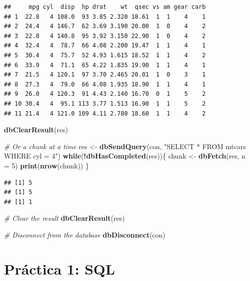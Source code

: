 \documentclass[]{book}
\newenvironment{Shaded}{\begin{snugshade}}{\end{snugshade}}
\newcommand{\CommentTok}[1]{\textcolor[rgb]{0.56,0.35,0.01}{\textit{#1}}}
\newcommand{\ControlFlowTok}[1]{\textcolor[rgb]{0.13,0.29,0.53}{\textbf{#1}}}
\newcommand{\DataTypeTok}[1]{\textcolor[rgb]{0.13,0.29,0.53}{#1}}
\newcommand{\DecValTok}[1]{\textcolor[rgb]{0.00,0.00,0.81}{#1}}
\newcommand{\KeywordTok}[1]{\textcolor[rgb]{0.13,0.29,0.53}{\textbf{#1}}}
\newcommand{\NormalTok}[1]{#1}
\newcommand{\OperatorTok}[1]{\textcolor[rgb]{0.81,0.36,0.00}{\textbf{#1}}}
\newcommand{\StringTok}[1]{\textcolor[rgb]{0.31,0.60,0.02}{#1}}
\begin{document}
\begin{verbatim}
##     mpg cyl  disp  hp drat    wt  qsec vs am gear carb
## 1  22.8   4 108.0  93 3.85 2.320 18.61  1  1    4    1
## 2  24.4   4 146.7  62 3.69 3.190 20.00  1  0    4    2
## 3  22.8   4 140.8  95 3.92 3.150 22.90  1  0    4    2
## 4  32.4   4  78.7  66 4.08 2.200 19.47  1  1    4    1
## 5  30.4   4  75.7  52 4.93 1.615 18.52  1  1    4    2
## 6  33.9   4  71.1  65 4.22 1.835 19.90  1  1    4    1
## 7  21.5   4 120.1  97 3.70 2.465 20.01  1  0    3    1
## 8  27.3   4  79.0  66 4.08 1.935 18.90  1  1    4    1
## 9  26.0   4 120.3  91 4.43 2.140 16.70  0  1    5    2
## 10 30.4   4  95.1 113 3.77 1.513 16.90  1  1    5    2
## 11 21.4   4 121.0 109 4.11 2.780 18.60  1  1    4    2
\end{verbatim}

\begin{Shaded}
\begin{Highlighting}[]
\KeywordTok{dbClearResult}\NormalTok{(res)}

\CommentTok{# Or a chunk at a time}
\NormalTok{res <-}\StringTok{ }\KeywordTok{dbSendQuery}\NormalTok{(con, }\StringTok{"SELECT * FROM mtcars WHERE cyl = 4"}\NormalTok{)}
\ControlFlowTok{while}\NormalTok{(}\OperatorTok{!}\KeywordTok{dbHasCompleted}\NormalTok{(res))\{}
\NormalTok{  chunk <-}\StringTok{ }\KeywordTok{dbFetch}\NormalTok{(res, }\DataTypeTok{n =} \DecValTok{5}\NormalTok{)}
  \KeywordTok{print}\NormalTok{(}\KeywordTok{nrow}\NormalTok{(chunk))}
\NormalTok{\}}
\end{Highlighting}
\end{Shaded}

\begin{verbatim}
## [1] 5
## [1] 5
## [1] 1
\end{verbatim}

\begin{Shaded}
\begin{Highlighting}[]
\CommentTok{# Clear the result}
\KeywordTok{dbClearResult}\NormalTok{(res)}

\CommentTok{# Disconnect from the database}
\KeywordTok{dbDisconnect}\NormalTok{(con)}
\end{Highlighting}
\end{Shaded}

\hypertarget{practica-1-sql}{%
\section{Práctica 1: SQL}\label{practica-1-sql}}
\end{document}
